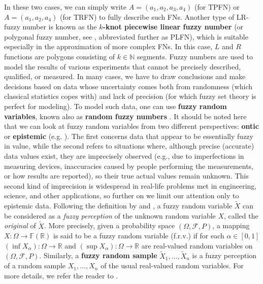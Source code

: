 In these two cases, we can simply write $A=(a_1, a_2, a_3, a_4)$ (for TPFN) or $A = (a_1, a_2, a_4)$ (for TRFN) to fully describe such FNs.
Another type of LR-fuzzy number is known as the \textbf{$k$-knot piecewise linear fuzzy number} \citep{Coroianu2019} (or polygonal fuzzy number, see \cite{Baez2012}, abbreviated further as PLFN), which is suitable especially in the approximation of more complex FNs.
In this case, $L$ and $R$ functions are polygons consisting of $k\in\mathbb{N}$ segments.
Fuzzy numbers are used to model the results of various experiments that cannot be precisely described, qualified, or measured.
In many cases, we have to draw conclusions and make decisions based on data whose uncertainty comes both from randomness (which classical statistics copes with) and lack of precision (for which fuzzy set theory is perfect for modeling). To model such data, one can use \textbf{fuzzy random variables}, known also as \textbf{random fuzzy numbers} \citep{FRV}.
It should be noted here that we can look at fuzzy random variables from two different perspectives: \textbf{ontic} or \textbf{epistemic} (e.g. \cite{Couso2014}). The first concerns data that appear to be essentially fuzzy in value, while the second refers to situations where, although precise (accurate) data values exist, they are imprecisely observed (e.g., due to imperfections in measuring devices, inaccuracies caused by people performing the measurements, or how results are reported), so their true actual values remain unknown. This second kind of imprecision is widespread in real-life problems met in engineering, science, and other applications, so further on we limit our attention only to epistemic data.
Following the definition by \cite{Kwakernaak} and \cite{Kruse1982}, a fuzzy random variable $\widetilde{X}$ can be considered as a \textit{fuzzy perception} of the unknown random variable $X$, called the \textit{original} of $\widetilde{X}$. More precisely, given a probability space $(\Omega,\mathcal{F},P)$, a mapping $X:\Omega \to\mathbb{F}(\mathbb{R})$ is said to be a fuzzy random variable (f.r.v.) if for each $\alpha\in [0,1]$ $(\inf X_\alpha):\Omega\to\mathbb{R}$ and $(\sup X_\alpha):\Omega\to\mathbb{R}$ are real-valued random variables on $(\Omega,\mathcal{F},P)$. Similarly, a \textbf{fuzzy random sample} $\widetilde{X}_1,\ldots,\widetilde{X}_n$ is a fuzzy perception of a random sample $X_1,\ldots,X_n$ of the usual real-valued random variables. For more details, we refer the reader to \cite{Kwakernaak,Kruse1982}.
